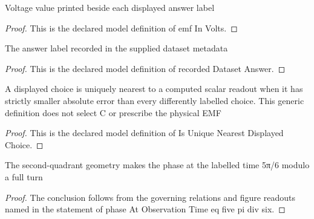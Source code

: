 \begin{definition}
  \label{def:physics:phyx-mini-0886:phyxminiproblems-problemphyxmini0886-answerchoice-emfinvolts}
  Voltage value printed beside each displayed answer label
\end{definition}
\begin{proof}
  This is the declared model definition of emf In Volts.
\end{proof}
\begin{definition}
  \label{def:physics:phyx-mini-0886:phyxminiproblems-problemphyxmini0886-recordeddatasetanswer}
  The answer label recorded in the supplied dataset metadata
\end{definition}
\begin{proof}
  This is the declared model definition of recorded Dataset Answer.
\end{proof}
\begin{definition}
  \label{def:physics:phyx-mini-0886:phyxminiproblems-problemphyxmini0886-isuniquenearestdisplayedchoice}
  A displayed choice is uniquely nearest to a computed scalar readout when it has strictly smaller absolute error than every differently labelled choice. This generic definition does not select C or prescribe the physical EMF
\end{definition}
\begin{proof}
  This is the declared model definition of Is Unique Nearest Displayed Choice.
\end{proof}
\begin{lemma}
  \label{lem:physics:phyx-mini-0886:phyxminiproblems-problemphyxmini0886-phaseatobservationtime-eq-five-pi-div-six}
  The second-quadrant geometry makes the phase at the labelled time 5π/6 modulo a full turn
\end{lemma}
\begin{proof}
  The conclusion follows from the governing relations and figure readouts named in the statement of phase At Observation Time eq five pi div six.
\end{proof}
